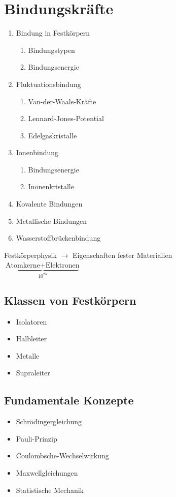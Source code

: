 \nr
\section{Bindungskr\"afte}

\begin{enumerate}
\item Bindung in Festkörpern
\begin{enumerate}
	\item Bindungstypen
	\item Bindungsenergie
\end{enumerate}
\item Fluktuationsbindung
\begin{enumerate}
	\item Van-der-Waals-Kräfte
	\item Lennard-Jones-Potential
	\item Edelgaskristalle
\end{enumerate}
\item Ionenbindung
\begin{enumerate}
	\item Bindungsenergie
	\item Inonenkristalle
\end{enumerate}
\item Kovalente Bindungen
\item Metallische Bindungen
\item Wasserstoffbrückenbindung
\end{enumerate}

Festkörperphysik $\to$ Eigenschaften fester Materialien \\
$\underbrace{ \text{Atomkerne}+\text{Elektronen} }_{10^{23}}$

\subsection{Klassen von Festkörpern}
\begin{itemize}
\item Isolatoren
\item Halbleiter
\item Metalle
\item Supraleiter
\end{itemize}

\subsection{Fundamentale Konzepte}
\begin{itemize}
\item Schrödingergleichung
\item Pauli-Prinzip
\item Coulombsche-Wechselwirkung
\item Maxwellgleichungen
\item Statistische Mechanik
\end{itemize}


